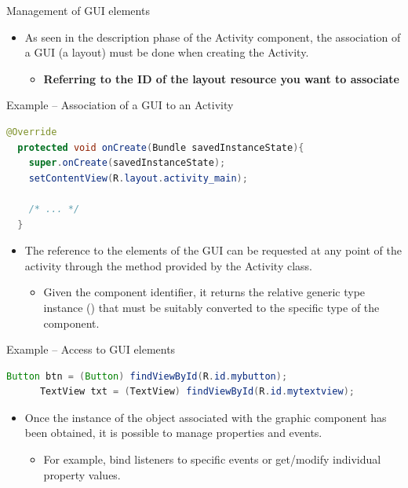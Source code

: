 \documentclass{beamer}
\begin{document}
  \begin{frame}{Management of GUI elements}
    \begin{itemize}
      \item As seen in the description phase of the Activity component, the
      association of a GUI (a layout) must be done when creating the Activity.
      \begin{itemize}
        \item \textbf{Referring to the ID of the layout resource you want to
        associate}
      \end{itemize}
    \end{itemize}

    \begin{exampleblock}{Example -- Association of a GUI to an Activity}
      \begin{lstlisting}[language=Java]  		        
  @Override
  protected void onCreate(Bundle savedInstanceState){
    super.onCreate(savedInstanceState);
    setContentView(R.layout.activity_main);
      
    /* ... */
  }
      \end{lstlisting}
    \end{exampleblock}

    \begin{itemize}
      \item The reference to the elements of the GUI can be requested at any point
      of the activity through the  method provided by
      the Activity class.
      \begin{itemize}
        \item Given the component identifier, it returns the relative generic
        type instance () that must be suitably converted to the
        specific type of the component.
      \end{itemize}
    \end{itemize}

    \begin{exampleblock}{Example -- Access to GUI elements}
      \begin{lstlisting}[language=Java]  		        
      Button btn = (Button) findViewById(R.id.mybutton);
      TextView txt = (TextView) findViewById(R.id.mytextview);
      \end{lstlisting}
    \end{exampleblock}

    \begin{itemize}
      \item Once the instance of the object associated with the graphic component
      has been obtained, it is possible to manage properties and events.
      \begin{itemize}
        \item For example, bind listeners to specific events or get/modify
        individual property values. 
      \end{itemize}
    \end{itemize}


\end{frame}
\end{document}
